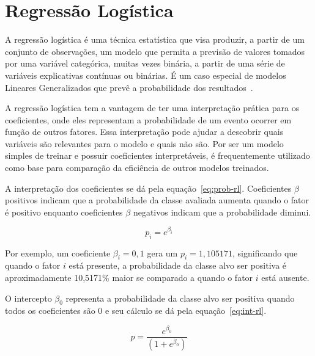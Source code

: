 \section{Regressão Logística}
\label{sec:fun:lr}

A regressão logística é uma técnica estatística que visa produzir, a partir de um conjunto de observações, um modelo que permita a previsão de valores tomados por uma variável categórica, muitas vezes binária, a partir de uma série de variáveis explicativas contínuas ou binárias.
É um caso especial de modelos Lineares Generalizados que prevê a probabilidade dos resultados~\cite{glmarticle}.

A regressão logística tem a vantagem de ter uma interpretação prática para os coeficientes, onde eles representam a probabilidade de um evento ocorrer em função de outros fatores.
Essa interpretação pode ajudar a descobrir quais variáveis são relevantes para o modelo e quais não são.
Por ser um modelo simples de treinar e possuir coeficientes interpretáveis, é frequentemente utilizado como base para comparação da eficiência de outros modelos treinados.

A interpretação dos coeficientes se dá pela equação~\ref{eq:prob-rl}.
Coeficientes $\beta$ positivos indicam que a probabilidade da classe avaliada aumenta quando o fator é positivo enquanto coeficientes $\beta$ negativos indicam que a probabilidade diminui.

\begin{equation}
    \label{eq:prob-rl}
    p_i = e^{\beta_i}
\end{equation}

Por exemplo, um coeficiente $\beta_i = 0,1$ gera um $p_i = 1,105171$, significando que quando o fator $i$ está presente, a probabilidade da classe alvo ser positiva é aproximadamente 10,5171\% maior se comparado a quando o fator $i$ está ausente.

O intercepto $\beta_0$ representa a probabilidade da classe alvo ser positiva quando todos os coeficientes são 0 e seu cálculo se dá pela equação~\ref{eq:int-rl}.

\begin{equation}
    \label{eq:int-rl}
    p = \frac{e^{\beta_0}}{(1 + e^{\beta_0}) }
\end{equation}
